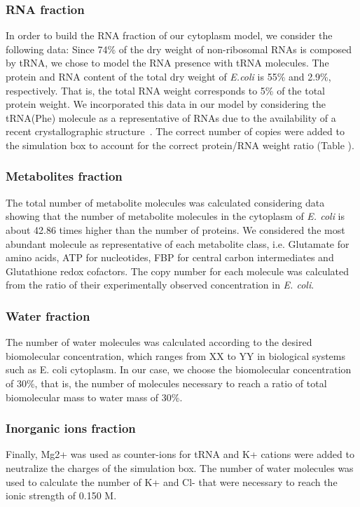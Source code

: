 \documentclass[journal=jacsat,manuscript=article]{achemso}
\begin{document}
\subsubsection{RNA fraction}
In order to build the RNA fraction of our cytoplasm model, we consider the following data:
Since 74\% of the dry weight of non-ribosomal RNAs is composed by tRNA, we chose to model the RNA presence with tRNA molecules.
The protein and RNA content of the total dry weight of \textit{E.coli} is 55\% and 2.9\%, respectively. That is, the total RNA weight corresponds to 5\% of the total protein weight. We incorporated this data in our model by considering the tRNA(Phe) molecule as a representative of RNAs due to the availability of a recent crystallographic structure~\cite{Byrne2015}. The correct number of copies were added to the simulation box to account for the correct protein/RNA weight ratio (Table ).

\subsubsection{Metabolites fraction}
The total number of metabolite molecules was calculated considering data showing that the number of metabolite molecules in the cytoplasm of \textit{E. coli} is about 42.86 times higher than the number of proteins. We considered the most abundant molecule as representative of each metabolite class, i.e. Glutamate for amino acids, ATP for nucleotides, FBP for central carbon intermediates and Glutathione redox cofactors. The copy number for each molecule was calculated from the ratio of their experimentally observed concentration in {\em E. coli}.

\subsubsection{Water fraction}
The number of water molecules was calculated according to the desired biomolecular concentration, which ranges from XX to YY in biological systems such as E. coli cytoplasm. In our case, we choose the biomolecular concentration of 30\%, that is, the number of molecules necessary to reach a ratio of total biomolecular mass to water mass of 30\%.


\subsubsection{Inorganic ions fraction}
Finally, Mg2+ was used as counter-ions for tRNA and K+ cations were added to neutralize the charges of the simulation box. The number of water molecules was used to calculate the number of K+ and Cl- that were necessary to reach the ionic strength of 0.150 M.
\end{document}

